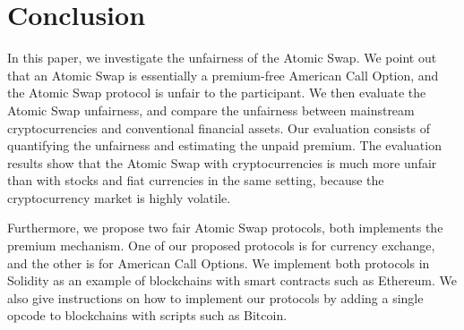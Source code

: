 \section{Conclusion}
\label{sec:conclusion}


In this paper, we investigate the unfairness of the Atomic Swap.
We point out that an Atomic Swap is essentially a premium-free American Call Option,
and the Atomic Swap protocol is unfair to the participant.
We then evaluate the Atomic Swap unfairness, and compare the unfairness between mainstream cryptocurrencies and conventional financial assets.
Our evaluation consists of quantifying the unfairness and estimating the unpaid premium.
The evaluation results show that the Atomic Swap with cryptocurrencies is much more unfair than with stocks and fiat currencies in the same setting, because the cryptocurrency market is highly volatile.

Furthermore, we propose two fair Atomic Swap protocols, both implements the premium mechanism.
One of our proposed protocols is for currency exchange, and the other is for American Call Options.
We implement both protocols in Solidity as an example of blockchains with smart contracts such as Ethereum.
We also give instructions on how to implement our protocols by adding a single opcode to blockchains with scripts such as Bitcoin.